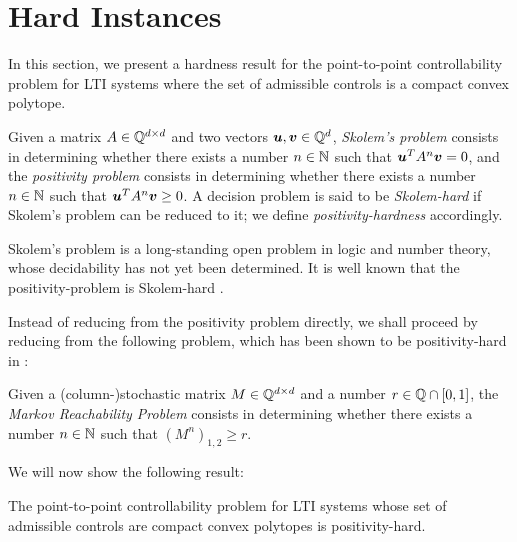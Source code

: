 \section{Hard Instances}

In this section, we present a hardness result for the point-to-point controllability problem for LTI systems where the set of admissible controls is a compact convex polytope.

\begin{definition}
Given a matrix $A \in \mathbb{Q}^{d \times d}$ and two vectors
$\boldsymbol{u}, \boldsymbol{v} \in \mathbb{Q}^{d}$, \emph{Skolem's problem} consists in determining
whether there exists a number $n \in \mathbb{N}$ such that
$\boldsymbol{u}^{T} A^{n} \boldsymbol{v} = 0$, and the \emph{positivity problem} consists in determining whether there exists a number $n \in \mathbb{N}$ such that $\boldsymbol{u}^{T} A^{n} \boldsymbol{v} \geq 0$. A decision problem is said to be \emph{Skolem-hard} if Skolem's problem can be reduced to it; we define \emph{positivity-hardness} accordingly.
\end{definition}

Skolem's problem is a long-standing open problem in logic and number theory, whose decidability has not yet been determined. It is well known that the positivity-problem is Skolem-hard \cite{PP}.

Instead of reducing from the positivity problem directly, we shall proceed by reducing from the following problem, which has been shown to be positivity-hard in \cite{MRP}:
\begin{definition}
Given a (column-)stochastic matrix $M \in \mathbb{Q}^{d \times d}$ and a number $r \in \mathbb{Q} \cap [0,1]$,
the \emph{Markov Reachability Problem} consists in determining whether there exists a number $n \in \mathbb{N}$ such that $\left( M^{n} \right)_{1,2} \geq r$.
\end{definition}

We will now show the following result:

\begin{theorem}
The point-to-point controllability problem for LTI systems whose set of admissible controls are compact convex polytopes is positivity-hard.
\end{theorem}

